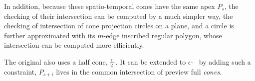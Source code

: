 
In addition, because these spatio-temporal cones have the same apex $P_s$, the checking of their intersection can be computed by a much simpler way, \ie the checking of intersection of cone projection circles on a plane, and a circle is further approximated with its $m$-edge inscribed regular polygon, whose intersection can be computed more efficiently. %
%



The original \cised also uses a half cone, $\frac{\epsilon}{2}$-\cone. It can be extended to ${\epsilon}$-\cone ~ by adding such a constraint, \ie $P_{s+i}$ lives in the common intersection of preview full \emph{cones}.




